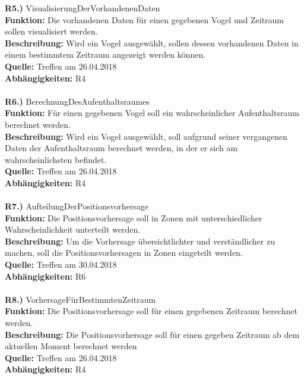 \documentclass{article}
\begin{document}
\textbf{R5.)} VisualisierungDerVorhandenenDaten \\
\textbf{Funktion:} Die vorhandenen Daten für einen gegebenen Vogel und Zeitraum sollen visualisiert werden. \\
\textbf{Beschreibung:} Wird ein Vogel ausgewählt, sollen dessen vorhandenen Daten in einem bestimmtem Zeitraum angezeigt werden können.\\
\textbf{Quelle:} Treffen am 26.04.2018 \\
\textbf{Abhängigkeiten:} R4 \\\\


\textbf{R6.)} BerechnungDesAufenthaltsraumes \\
\textbf{Funktion:} Für einen gegebenen Vogel soll ein wahrscheinlicher Aufenthaltsraum berechnet werden. \\
\textbf{Beschreibung:} Wird ein Vogel ausgewählt, soll aufgrund seiner vergangenen Daten der Aufenthaltsraum berechnet werden, in der er sich am wahrscheinlichsten befindet. \\
\textbf{Quelle:} Treffen am 26.04.2018 \\
\textbf{Abhängigkeiten:} R4 \\\\



\textbf{R7.)} AufteilungDerPositionsvorhersage \\
\textbf{Funktion:} Die Positionsvorhersage soll in Zonen mit unterschiedlicher Wahrscheinlichkeit unterteilt werden. \\
\textbf{Beschreibung:} Um die Vorhersage übersichtlichter und verständlicher zu machen, soll die Positionsvorhersagen in Zonen eingeteilt werden.  \\
\textbf{Quelle:} Treffen am 30.04.2018 \\
\textbf{Abhängigkeiten:} R6 \\\\


\textbf{R8.)} VorhersageFürBestimmtenZeitraum \\
\textbf{Funktion:} Die Positionsvorhersage soll für einen gegebenen Zeitraum berechnet werden. \\
\textbf{Beschreibung:} Die Positionsvorhersage soll für einen gegeben Zeitraum ab dem aktuellen Moment berechnet werden \\
\textbf{Quelle:} Treffen am 26.04.2018 \\
\textbf{Abhängigkeiten:} R4 \\\\
\end{document}
